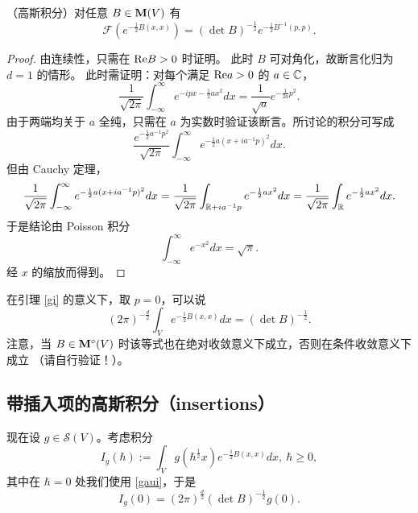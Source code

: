\begin{lemma}\label{gi}（高斯积分）对任意 $B\in \bold M(V)$ 有
$$
\mathcal F(e^{-\frac{1}{2}B(x,x)})=(\det B)^{-\frac{1}{2}} e^{-\frac{1}{2}B^{-1}(p,p)}.
$$
\end{lemma} 

\begin{proof} 由连续性，只需在 ${\rm Re}B>0$ 时证明。
此时 $B$ 可对角化，故断言化归为 $d=1$ 的情形。
此时需证明：对每个满足 ${\rm Re}a>0$ 的 $a\in \Bbb C$，
$$
\frac{1}{\sqrt{2\pi}}\int_{-\infty}^\infty e^{-ipx-\frac{1}{2}ax^2}dx=
\frac{1}{\sqrt{a}}e^{-\frac{1}{2a}p^2}.
$$
由于两端均关于 $a$ 全纯，只需在 $a$ 为实数时验证该断言。所讨论的积分可写成
$$
\frac{e^{-\frac{1}{2}a^{-1}p^2}}{\sqrt{2\pi}}\int_{-\infty}^\infty e^{-\frac{1}{2}a(x+ia^{-1}p)^2}dx.
$$
但由 Cauchy 定理，
$$
\frac{1}{\sqrt{2\pi}}\int_{-\infty}^\infty e^{-\frac{1}{2}a(x+ia^{-1}p)^2}dx=
\frac{1}{\sqrt{2\pi}}\int_{\Bbb R+ia^{-1}p} e^{-\frac{1}{2}ax^2}dx=
\frac{1}{\sqrt{2\pi}}\int_{\Bbb R} e^{-\frac{1}{2}ax^2}dx.
$$
于是结论由 Poisson 积分
$$
\int_{-\infty}^\infty e^{-x^2}dx=\sqrt{\pi}.
$$
经 $x$ 的缩放而得到。
\end{proof} 

在引理 \ref{gi} 的意义下，取 $p=0$，可以说
\begin{equation}\label{gaui}
(2\pi)^{-\frac{d}{2}}\int_V e^{-\frac{1}{2}B(x,x)}dx=(\det B)^{-\frac{1}{2}}.
\end{equation} 
注意，当 $B\in \bold M^\circ(V)$ 时该等式也在绝对收敛意义下成立，否则在条件收敛意义下成立
（请自行验证！）。

\subsection{带插入项的高斯积分（insertions）} \label{inse}


现在设 $g\in \mathcal S(V)$。考虑积分
$$
I_g(\hbar):=\int_{V}g(\hbar^{\frac{1}{2}}x)e^{-\frac{1}{2}B(x,x)}dx,\ \hbar\ge 0,
$$
其中在 $\hbar=0$ 处我们使用 \eqref{gaui}，于是
\begin{equation}\label{valzer}
I_g(0)=(2\pi)^{\frac{d}{2}}(\det B)^{-\frac{1}{2}}g(0). 
\end{equation}

